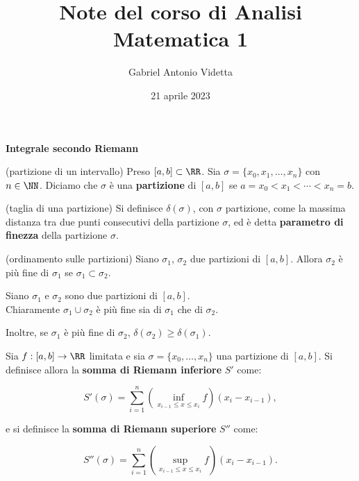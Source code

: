 \documentclass[11pt]{article}
\title{\textbf{Note del corso di Analisi Matematica 1}}
\author{Gabriel Antonio Videtta}
\date{21 aprile 2023}
\begin{document}
	
	\maketitle
	
	\begin{center}
		\Large \textbf{Integrale secondo Riemann}
	\end{center}

	\begin{definition} (partizione di un intervallo)
		Preso $[a, b] \subset \RR$. Sia $\sigma = \{x_0, x_1, \ldots, x_n \}$
		con $n \in \NN$. Diciamo che $\sigma$ è una \textbf{partizione}
		di $[a, b]$ se $a = x_0 < x_1 < \cdots < x_n = b$.
	\end{definition}

	\begin{definition} (taglia di una partizione)
		Si definisce $\delta(\sigma)$, con $\sigma$ partizione,
		come la massima distanza tra due punti consecutivi della partizione $\sigma$, ed è detta \textbf{parametro di finezza} della partizione $\sigma$.
	\end{definition}

	\begin{definition} (ordinamento sulle partizioni)
		Siano $\sigma_1$, $\sigma_2$ due partizioni di $[a, b]$. Allora
		$\sigma_2$ è più fine di $\sigma_1$ se $\sigma_1 \subset \sigma_2$.
	\end{definition}

	\begin{remark}
		Siano $\sigma_1$ e $\sigma_2$ sono due partizioni di $[a, b]$. \\
		
		\li Chiaramente $\sigma_1 \cup \sigma_2$ è più fine sia di
		$\sigma_1$ che di $\sigma_2$.
		
		\li Inoltre, se $\sigma_1$ è più fine di $\sigma_2$,
		$\delta(\sigma_2) \geq \delta(\sigma_1)$. 
	\end{remark}

	\begin{definition} 
		Sia $f : [a, b] \to \RR$ limitata e sia $\sigma = \{ x_0, \ldots, x_n \}$ una partizione
		di $[a, b]$. Si definisce allora la \textbf{somma di Riemann inferiore}
		$S'$ come:
		
		\[ S'(\sigma) = \sum_{i=1}^n \left( \inf_{x_{i-1} \leq x \leq x_i} f \right) (x_i - x_{i-1}), \]
		
		e si definisce la \textbf{somma di Riemann superiore} $S''$ come:
		
		\[ S''(\sigma) = \sum_{i=1}^n \left( \sup_{x_{i-1} \leq x \leq x_i} f \right) (x_i - x_{i-1}). \]
	\end{definition}
\end{document}
